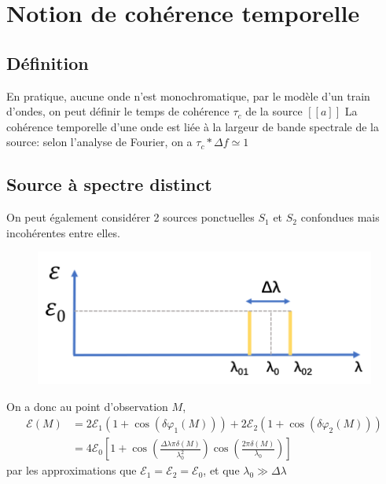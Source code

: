 \documentclass[a4paper,12pt]{book}
\begin{document}
\renewcommand{\labelitemi}{$\blacktriangleright$}
\renewcommand{\labelitemii}{$\bullet$}


\section{Notion de cohérence temporelle}
\subsection{Définition}
En pratique, aucune onde n'est monochromatique, par le modèle d'un train d'ondes, on peut définir le temps de cohérence $\tau_c$ de la source
$[\![a]\!]$
La cohérence temporelle d'une onde est liée à la largeur de bande spectrale de la source: selon l'analyse de Fourier, on a $\tau_c * \Delta f \simeq 1$
\subsection{Source à spectre distinct}
On peut également considérer 2 sources ponctuelles $S_1$ et $S_2$ confondues mais incohérentes entre elles. 
\begin{figure}[h]
    \begin{center}
    \includegraphics[scale=0.4]{tr141.png}
    \end{center}
\end{figure}

On a donc au point d'observation $M$, 
\begin{align*}
    \mathcal{E}(M)&=2\mathcal{E}_1(1+\cos(\delta\varphi_1(M)))+2\mathcal{E}_2(1+\cos(\delta\varphi_2(M)))\\
    &=4\mathcal{E}_0\left[1+\cos\left(\frac{\Delta\lambda\pi\delta(M)}{\lambda_0^2}\right)\cos\left(\frac{2\pi\delta(M)}{\lambda_0}\right)\right]
\end{align*}
par les approximations que $\mathcal{E}_1=\mathcal{E}_2=\mathcal{E}_0$, et que $\lambda_0 \gg \Delta\lambda$
\end{document}
